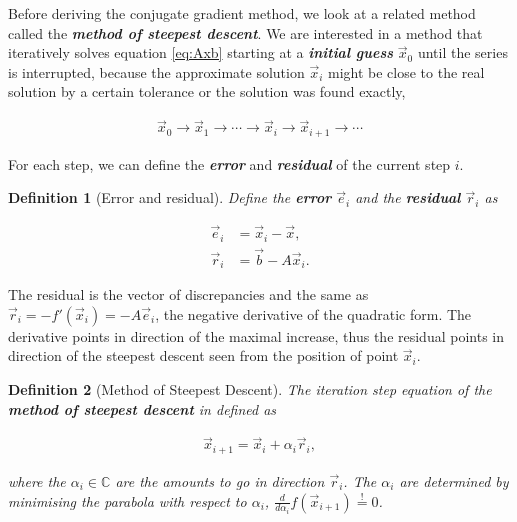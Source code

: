 \documentclass{article}
\theoremstyle{plain} %
\newtheorem{definition}{Definition}[section]
\theoremstyle{convention} %
\theoremstyle{remark} %
\def\df#1{\textbf{\textit{#1}}}
\numberwithin{equation}{section}
\begin{document}
Before deriving the conjugate gradient method, we look at a related method called the \df{method of steepest descent}. We are interested in a method that iteratively solves equation \eqref{eq:Axb} starting at a \df{initial guess} $\vec{x}_0$ until the series is interrupted, because the approximate solution $\vec{x}_i$ might be close to the real solution by a certain tolerance or the solution was found exactly,

\begin{align*}
    \vec{x}_0 \longrightarrow \vec{x}_1 \longrightarrow \dotsb \longrightarrow \vec{x}_i \longrightarrow \vec{x}_{i+1} \longrightarrow \dotsb
\end{align*}

For each step, we can define the \df{error} and \df{residual} of the current step $i$.

\begin{definition}[Error and residual]

Define the \df{error} $\vec{e}_i$ and the \df{residual} $\vec{r}_i$ as

\begin{subequations}
    \begin{align}
        \vec{e}_i &= \vec{x}_i - \vec{x}, \label{eq:error} \\
        \vec{r}_i &= \vec{b} - A \vec{x}_i. \label{eq:residual}
    \end{align}
\end{subequations}

\end{definition}

The residual is the vector of discrepancies and the same as $\vec{r}_i = -f'(\vec{x}_i) = -A \vec{e}_i$, the negative derivative of the quadratic form. The derivative points in direction of the maximal increase, thus the residual points in direction of the steepest descent seen from the position of point $\vec{x}_i$.

\begin{definition}[Method of Steepest Descent]
The iteration step equation of the \df{method of steepest descent} in defined as

\begin{align}
    \vec{x}_{i+1} = \vec{x}_i + \alpha_i \vec{r}_i \label{eq:steepest_descent},
\end{align}

where the $\alpha_i \in \mathbb{C}$ are the amounts to go in direction $\vec{r}_i$. The $\alpha_i$ are determined by minimising the parabola with respect to $\alpha_i$, $\frac{d}{d \alpha_i} f(\vec{x}_{i+1}) \stackrel{!}{=} 0$.

\end{definition}
\end{document}
